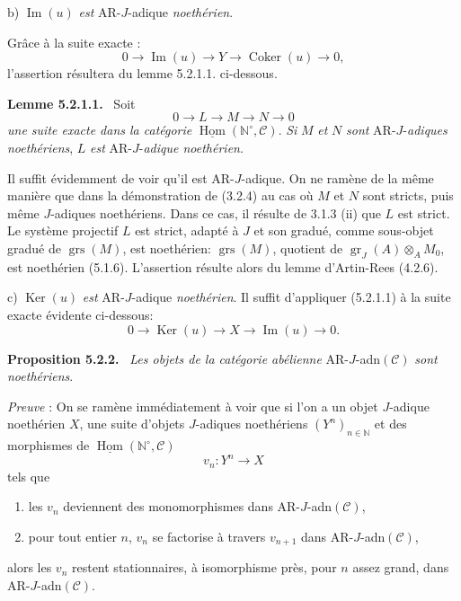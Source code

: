 \documentclass[11pt]{article}
\newenvironment{statement}[1]{\par\medskip\noindent\textbf{#1.}\ }{\par\medskip}
\DeclareMathOperator{\Hom}{Hom}
\providecommand{\Ker}{\operatorname{Ker}}
\providecommand{\Coker}{\operatorname{Coker}}
\providecommand{\uHom}{\underline{\Hom}}
\providecommand{\gr}{\operatorname{gr}}
\providecommand{\Hom}{\operatorname{Hom}}
\providecommand{\Im}{\operatorname{Im}}
\providecommand{\Ker}{\operatorname{Ker}}
\providecommand{\Coker}{\operatorname{Coker}}
\providecommand{\gr}{\operatorname{gr}}
\renewcommand{\Im}{\operatorname{Im}}
\providecommand{\gr}{\operatorname{gr}}
\providecommand{\grs}{\operatorname{grs}}
\providecommand{\Ker}{\operatorname{Ker}}
\providecommand{\Coker}{\operatorname{Coker}}
\providecommand{\Im}{\operatorname{Im}}
\providecommand{\Hom}{\operatorname{Hom}}
\begin{document}
b) \(\Im(u)\) \emph{est} AR-\(J\)-adique \emph{noethérien}.

Grâce à la suite exacte :
\[
0\longrightarrow \Im(u)\longrightarrow Y\longrightarrow \Coker(u)\longrightarrow 0,
\]
l'assertion résultera du lemme 5.2.1.1. ci-dessous.

\begin{statement}{Lemme 5.2.1.1}
Soit
\[
0\longrightarrow L\longrightarrow M\longrightarrow N\longrightarrow0
\]
\emph{une suite exacte dans la catégorie} \(\uHom(\mathbb N^\circ,\mathcal C)\). \emph{Si} \(M\) \emph{et} \(N\) \emph{sont} AR-\(J\)-\emph{adiques noethériens}, \(L\) \emph{est} AR-\(J\)-\emph{adique noethérien}.
\end{statement}

Il suffit évidemment de voir qu'il est AR-\(J\)-adique. On ne ramène de la même manière que dans la démonstration de (3.2.4) au cas où \(M\) et \(N\) sont stricts, puis même \(J\)-adiques noethériens. Dans ce cas, il résulte de 3.1.3 (ii) que \(L\) est strict. Le système projectif \(L\) est strict, adapté à \(J\) et son gradué, comme sous-objet gradué de \(\grs(M)\), est noethérien: \(\grs(M)\), quotient de \(\gr_J(A)\otimes_A M_0\), est noethérien (5.1.6). L'assertion résulte alors du lemme d'Artin-Rees (4.2.6).

c) \(\Ker(u)\) \emph{est} AR-\(J\)-adique \emph{noethérien}. Il suffit d'appliquer (5.2.1.1) à la suite exacte évidente ci-dessous:
\[
0\longrightarrow \Ker(u)\longrightarrow X\longrightarrow \Im(u)\longrightarrow0.
\]

\begin{statement}{Proposition 5.2.2}
\emph{Les objets de la catégorie abélienne} AR-\(J\)-adn\((\mathcal C)\) \emph{sont noethériens}.
\end{statement}

\emph{Preuve} : On se ramène immédiatement à voir que si l'on a un objet \(J\)-adique noethérien \(X\), une suite d'objets \(J\)-adiques noethériens \((Y^n)_{n\in\mathbb N}\) et des morphismes de \(\uHom(\mathbb N^\circ,\mathcal C)\)
\[
v_n:Y^n\longrightarrow X
\]
tels que
\begin{enumerate}[label=\textup{(\roman*)}]
\item les \(v_n\) deviennent des monomorphismes dans AR-\(J\)-adn\((\mathcal C)\),
\item pour tout entier \(n\), \(v_n\) se factorise à travers \(v_{n+1}\) dans AR-\(J\)-adn\((\mathcal C)\),
\end{enumerate}
alors les \(v_n\) restent stationnaires, à isomorphisme près, pour \(n\) assez grand, dans AR-\(J\)-adn\((\mathcal C)\).
\end{document}
